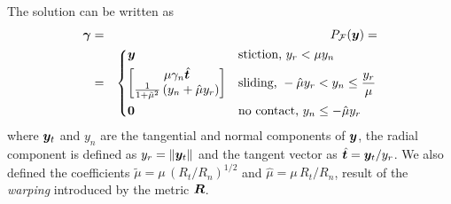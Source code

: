 The solution can be written as
\begin{eqnarray}
	\bgamma &=& P_\mathcal{F}(\vf{y}) = \\
    &=&\begin{dcases}
	\vf{y} 
	& \text{stiction, } y_r < \mu y_n\\
	\begin{bmatrix}
		\mu\gamma_n\hat{\vf{t}}\\
		\frac{1}{1+\tilde\mu^2}\left(y_n +
        \hat\mu y_r\right)
	\end{bmatrix}
	& \text{sliding, } -\hat\mu y_r < y_n \leq \frac{y_r}{\mu}\\
    \vf{0} & \text{no contact, } y_n \leq -\hat\mu y_r
\end{dcases}\nonumber
	\label{eq:contact_projection}
\end{eqnarray}
where ${\bm{y}}_t$ and $y_n$ are the tangential and normal components of ${\bm{y}}$,
the radial component is defined as $y_r=\Vert{\bm{y}}_t\Vert$ and the tangent
vector as $\hat{{\bm{t}}}={\bm{y}}_t/y_r$. We also defined the
coefficients $\tilde\mu=\mu\,(R_t/R_n)^{1/2}$ and $\hat\mu=\mu\,R_t/R_n$, result
of the \textit{warping} introduced by the metric ${\bm{R}}$.
